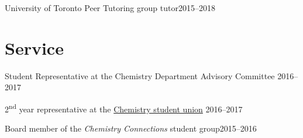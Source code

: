 \documentclass[margin,line]{res}
\begin{document}
\begin{resume}
\vspace{-0.3cm}

University of Toronto Peer Tutoring group tutor\hfill{2015--2018}

\section{\sc Service}

Student Representative at the Chemistry Department Advisory Committee \hfill{2016--2017}

\vspace*{-2.5mm}

2\textsuperscript{nd} year representative at the \href{https://csu.sa.utoronto.ca/events-2013-2014/previous-executive-teams/exceutive-team-2015-2016/}{Chemistry student union} \hfill{2016--2017}

\vspace*{-2.5mm}

Board member of the {\em Chemistry Connections} student group\hfill {2015--2016}

\end{resume}

\newpage

\pagestyle{headings}
\end{document}
